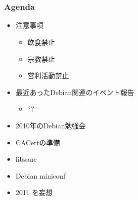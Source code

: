 \frame{\titlepage{}}

\section{}
\begin{frame}
 \frametitle{Agenda}
\begin{minipage}[t]{0.45\hsize}
  \begin{itemize}
  \item 注意事項
	\begin{itemize}
	 \item 飲食禁止
	 \item 宗教禁止
	 \item 営利活動禁止
	\end{itemize}
  \item 最近あったDebian関連のイベント報告
	\begin{itemize}
	 \item ??
	\end{itemize}
 \end{itemize}
\end{minipage} 
\begin{minipage}[t]{0.45\hsize}
 \begin{itemize}
  \item 2010年のDebian勉強会
  \item CACertの準備
  \item libsane
  \item Debian miniconf
  \item 2011 を妄想
 \end{itemize}
\end{minipage}
\end{frame}


{\footnotesize
 
}



